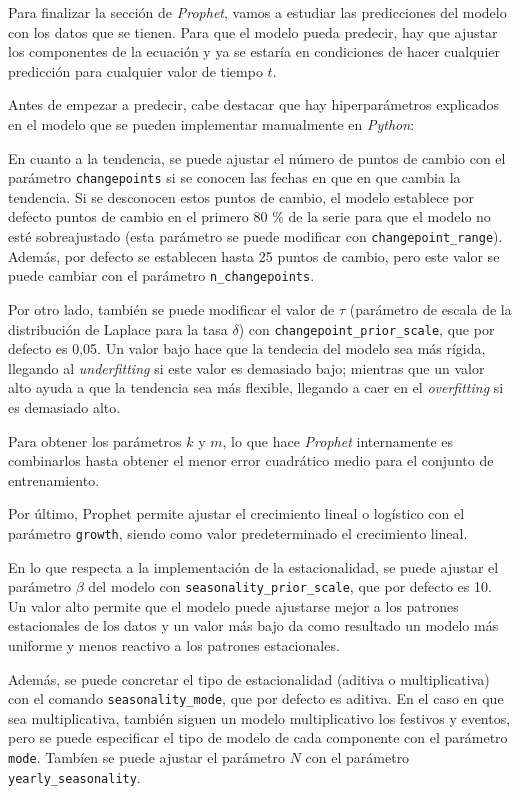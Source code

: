 \documentclass[12pt,twoside]{article}
\begin{document}
Para finalizar la sección de \textit{Prophet}, vamos a estudiar las predicciones del modelo con los datos que se tienen. Para que el modelo pueda predecir, hay que ajustar los componentes de la ecuación y ya se estaría en condiciones de hacer cualquier predicción para cualquier valor de tiempo $t$.

Antes de empezar a predecir, cabe destacar que hay hiperparámetros \cite{prophet2} explicados en el modelo que se pueden implementar manualmente en \textit{Python}:

En cuanto a la tendencia, se puede ajustar el número de puntos de cambio con el parámetro \texttt{changepoints} si se conocen las fechas en que en que cambia la tendencia. Si se desconocen estos puntos de cambio, el modelo establece por defecto puntos de cambio en el primero 80 \% de la serie para que el modelo no esté sobreajustado (esta parámetro se puede modificar con \texttt{changepoint\_range}). Además, por defecto se establecen hasta 25 puntos de cambio, pero este valor se puede cambiar con el parámetro \texttt{n\_changepoints}.

Por otro lado, también se puede modificar el valor de $\tau$ (parámetro de escala de la distribución de Laplace para la tasa $\delta$) con \texttt{changepoint\_prior\_scale}, que por defecto es 0,05. Un valor bajo hace que la tendecia del modelo sea más rígida, llegando al \textit{underfitting} si este valor es demasiado bajo; mientras que un valor alto ayuda a que la tendencia sea más flexible, llegando a caer en el \textit{overfitting} si es demasiado alto.

Para obtener los parámetros $k$ y $m$, lo que hace \textit{Prophet} internamente es combinarlos hasta obtener el menor error cuadrático medio para el conjunto de entrenamiento.

Por último, Prophet permite ajustar el crecimiento lineal o logístico con el parámetro \texttt{growth}, siendo como valor predeterminado el crecimiento lineal.

En lo que respecta a la implementación de la estacionalidad, se puede ajustar el parámetro $\beta$ del modelo con \texttt{seasonality\_prior\_scale}, que por defecto es 10. Un valor alto permite que el modelo puede ajustarse mejor a los patrones estacionales de los datos y un valor más bajo da como resultado un modelo más uniforme y menos reactivo a los patrones estacionales.

Además, se puede concretar el tipo de estacionalidad (aditiva o multiplicativa) con el comando \texttt{seasonality\_mode}, que por defecto es aditiva. En el caso en que sea multiplicativa, también siguen un modelo multiplicativo los festivos y eventos, pero se puede especificar el tipo de modelo de cada componente con el parámetro \texttt{mode}. Tambíen se puede ajustar el parámetro $N$ con el parámetro \texttt{yearly\_seasonality}.
\end{document}
